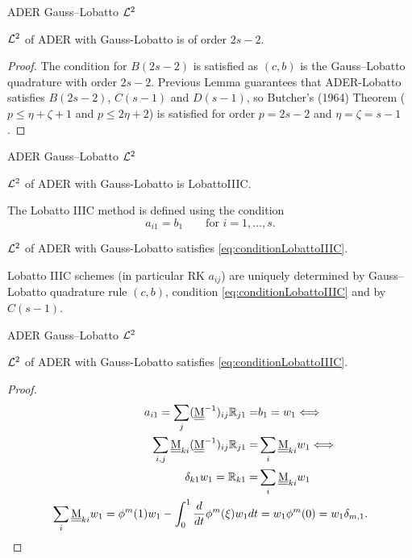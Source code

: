 \documentclass[9pt,compress,t,aspectratio=169]{beamer}
\begin{document}
\begin{frame}{ADER Gauss--Lobatto $\mathcal{L}^2$}
	\begin{theorem}
		$\mathcal{L}^2$ of ADER with Gauss-Lobatto is of order $2s-2$.
	\end{theorem}
	\begin{proof}
		The condition for $B(2s-2)$ is satisfied as $(c,b)$ is the Gauss--Lobatto quadrature 
		with order $2s-2$.
		Previous Lemma  guarantees that ADER-Lobatto satisfies $B(2s-2)$, $C(s-1)$ and $D(s-1)$, 
		so Butcher's (1964) Theorem  ($p\leq \eta +\zeta +1$ and $p\leq 2\eta +2$) is satisfied
		for order $p=2s-2$ and $\eta = \zeta=s-1$.
	\end{proof}	
\end{frame}
\begin{frame}{ADER Gauss--Lobatto $\mathcal{L}^2$}
	\begin{theorem}
		$\mathcal{L}^2$ of ADER with Gauss-Lobatto is LobattoIIIC.
	\end{theorem}

	The Lobatto IIIC method is defined using the condition
	\begin{equation}\label{eq:conditionLobattoIIIC}
		a_{i1}=b_1 \qquad \text{for }i=1,\dots,s.
	\end{equation}


\begin{lemma}\label{lem:conditionLobattoIIIC}
	$\mathcal{L}^2$ of ADER with Gauss-Lobatto satisfies \eqref{eq:conditionLobattoIIIC}.
\end{lemma}
	\begin{theorem}[Chipman 1971]\label{th:uniquenessLobatto}
		Lobatto IIIC schemes (in particular RK $a_{ij}$) are uniquely determined 
		by Gauss--Lobatto quadrature rule $(c,b)$, condition \eqref{eq:conditionLobattoIIIC} 
		and by $C(s-1)$. 
	\end{theorem}
	
\end{frame}

\begin{frame}{ADER Gauss--Lobatto $\mathcal{L}^2$}
	\begin{lemma}\label{lem:conditionLobattoIIIC}
		$\mathcal{L}^2$ of ADER with Gauss-Lobatto satisfies \eqref{eq:conditionLobattoIIIC}.
	\end{lemma}
	\begin{proof}
		\begin{align*}
			a_{i1}=\sum_j (\underline{\underline{\mathrm{M}}}^{-1})_{ij}\mathbb{R}_{j1}=&b_1 = w_1 \Longleftrightarrow	\\
			\sum_{i,j}\underline{\underline{\mathrm{M}}}_{ki}(\underline{\underline{\mathrm{M}}}^{-1})_{ij}\mathbb{R}_{j1}=&\sum_i \underline{\underline{\mathrm{M}}}_{ki}w_1 \Longleftrightarrow \\
			\delta_{k1}w_1=\mathbb{R}_{k1}=&\sum_i \underline{\underline{\mathrm{M}}}_{ki}w_1\\
			\sum_i \underline{\underline{\mathrm{M}}}_{ki}w_1=\phi^m(1) w_1 -  \int_0^1 \frac{d}{dt}\phi^m(\xi)  
			 w_1 dt  &= w_1 \phi^m(0)  = w_1 \delta_{m,1}.
		\end{align*}
	\end{proof}
\end{frame}
\end{document}
